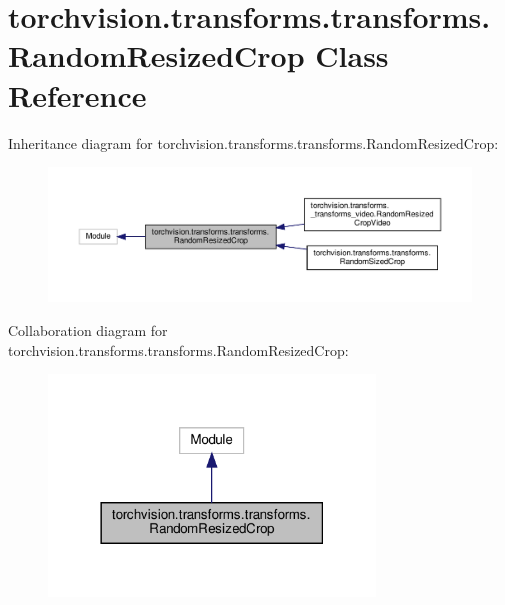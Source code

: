 \hypertarget{classtorchvision_1_1transforms_1_1transforms_1_1RandomResizedCrop}{}\section{torchvision.\+transforms.\+transforms.\+Random\+Resized\+Crop Class Reference}
\label{classtorchvision_1_1transforms_1_1transforms_1_1RandomResizedCrop}


Inheritance diagram for torchvision.\+transforms.\+transforms.\+Random\+Resized\+Crop\+:
\nopagebreak
\begin{figure}[H]
\begin{center}
\leavevmode
\includegraphics[width=350pt]{classtorchvision_1_1transforms_1_1transforms_1_1RandomResizedCrop__inherit__graph}
\end{center}
\end{figure}


Collaboration diagram for torchvision.\+transforms.\+transforms.\+Random\+Resized\+Crop\+:
\nopagebreak
\begin{figure}[H]
\begin{center}
\leavevmode
\includegraphics[width=246pt]{classtorchvision_1_1transforms_1_1transforms_1_1RandomResizedCrop__coll__graph}
\end{center}
\end{figure}
